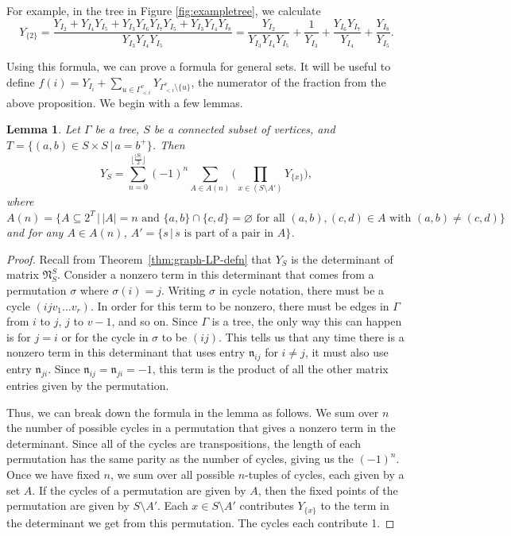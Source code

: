 \documentclass[pdftex]{sigma}
\numberwithin{equation}{section}
\newtheorem{Lemma}[Theorem]{Lemma}
\begin{document}
For example, in the tree in Figure \ref{fig:exampletree}, we calculate
\[
Y_{\{2\}} = \frac{Y_{I_2} + Y_{I_4}Y_{I_5} + Y_{I_3}Y_{I_6}Y_{I_7}Y_{I_5} + Y_{I_3}Y_{I_4}Y_{I_8}}{Y_{I_3}Y_{I_4}Y_{I_5}} = \frac{Y_{I_2}}{Y_{I_3}Y_{I_4}Y_{I_5}} + \frac{1}{Y_{I_3}} + \frac{Y_{I_6}Y_{I_7}}{Y_{I_4}} + \frac{Y_{I_8}}{Y_{I_5}}.
\]

Using this formula, we can prove a formula for general sets. It will be useful to define $f(i)=Y_{I_i}+\sum_{u\in\Gamma_{\lessdot i}^v}Y_{\Gamma_{< i}^v\setminus\{u\}}$, the numerator of the fraction from the above proposition. We begin with a few lemmas.

\begin{Lemma}\label{lem:Y-sum}
Let $\Gamma$ be a tree, $S$ be a connected subset of vertices, and $T=\{(a,b)\in S\times S\, |\, a=b^+\}$. Then
\[ Y_S=\sum_{n=0}^{\big\lfloor\frac{|S|}{2}\big\rfloor}(-1)^n\sum_{A\in A(n)}\bigg(\prod_{x\in (S\setminus A')}Y_{\{x\}}\bigg),\]
where $A(n)=\{A\subseteq 2^T\, |\, |A|=n\text{ and }\{a,b\}\cap\{c,d\}=\varnothing\text{ for all }(a,b),(c,d)\in A\text{ with }(a,b)\neq(c,d)\}$ and for any $A\in A(n)$, $A'=\{s\, |\, s\text{ is part of a pair in }A\}$.
\end{Lemma}

\begin{proof}
Recall from Theorem~\ref{thm:graph-LP-defn} that $Y_S$ is the determinant of matrix $\mathfrak{N}_S^S$. Consider a nonzero term in this determinant that comes from a permutation $\sigma$ where $\sigma(i)=j$. Writing $\sigma$ in cycle notation, there must be a cycle $(ijv_1\dots v_r)$. In order for this term to be nonzero, there must be edges in $\Gamma$ from $i$ to $j$, $j$ to $v-1$, and so on. Since $\Gamma$ is a tree, the only way this can happen is for $j=i$ or for the cycle in $\sigma$ to be $(ij)$. This tells us that any time there is a nonzero term in this determinant that uses entry $\mathfrak{n}_{ij}$ for $i\neq j$, it must also use entry $\mathfrak{n}_{ji}$. Since $\mathfrak{n}_{ij}=\mathfrak{n}_{ji}=-1$, this term is the product of all the other matrix entries given by the permutation.

Thus, we can break down the formula in the lemma as follows. We sum over $n$ the number of possible cycles in a permutation that gives a nonzero term in the determinant. Since all of the cycles are transpositions, the length of each permutation has the same parity as the number of cycles, giving us the $(-1)^n$. Once we have fixed $n$, we sum over all possible $n$-tuples of cycles, each given by a set $A$. If the cycles of a permutation are given by $A$, then the fixed points of the permutation are given by $S\setminus A'$. Each $x\in S\setminus A'$ contributes $Y_{\{x\}}$ to the term in the determinant we get from this permutation. The cycles each contribute 1.
\end{proof}
\end{document}
